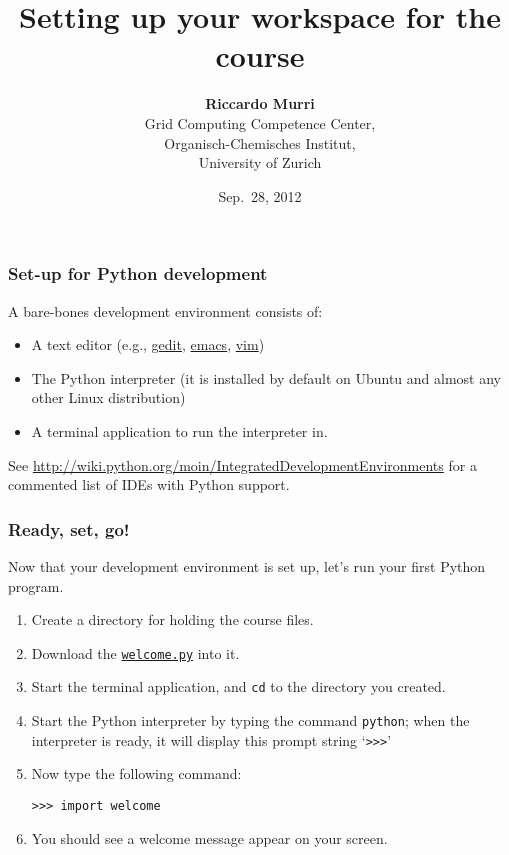 \documentclass[english,serif,mathserif,xcolor=pdftex,dvipsnames,table]{beamer}
\title[Set-up]{%
  Setting up your workspace for the course
}
\author[R. Murri]{%
  \textbf{Riccardo Murri} \\
  Grid Computing Competence Center, \\
  Organisch-Chemisches Institut, \\
  University of Zurich
}
\date{Sep.~28, 2012}
\begin{document}
\maketitle


\begin{frame}
  \frametitle{Set-up for Python development}
  A bare-bones development environment consists of:
  \begin{itemize}
  \item A text editor (e.g.,
    \href{http://en.wikipedia.org/wiki/Gedit}{gedit}, 
    \href{http://hide1713.wordpress.com/2009/01/30/setup-perfect-python-environment-in-emacs/}{emacs},
    \href{http://blog.dispatched.ch/2009/05/24/vim-as-python-ide/}{vim})
  \item The Python interpreter (it is installed by default on
    Ubuntu and almost any other Linux distribution)
  \item A terminal application to run the interpreter in.
  \end{itemize}

  \+ See
  {\small \url{http://wiki.python.org/moin/IntegratedDevelopmentEnvironments}}
  for a commented list of {IDEs} with Python support.
\end{frame}


\begin{frame}[fragile]
  \frametitle{Ready, set, go!}

  Now that your development environment is set up, let's run your
  first Python program.
  \begin{enumerate}
  \item Create a directory for holding the course files.
  \item Download the \href{http://www.gc3.uzh.ch/welcome.py}{\texttt{welcome.py}} into it.
  \item Start the terminal application, and \texttt{cd} to the directory you created.
  \item Start the Python interpreter by typing the command \texttt{python}; when the interpreter is ready, it will display this prompt string `\texttt{>>>}'
  \item Now type the following command:
    \begin{lstlisting}
>>> import welcome      
    \end{lstlisting}
  \item You should see a welcome message appear on your screen.
  \end{enumerate}
  
\end{frame}
\end{document}

